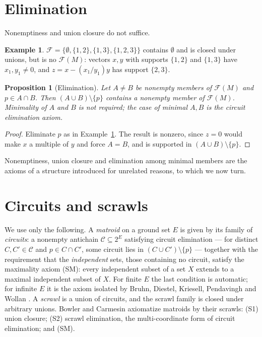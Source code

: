 \documentclass[11pt,reqno]{amsart}
\newtheorem{proposition}[theorem]{Proposition}
\theoremstyle{definition}
\newtheorem{example}[theorem]{Example}
\newcommand{\F}{\mathcal{F}}
\begin{document}
\section{Elimination}\label{sec:elimination}

Nonemptiness and union closure do not suffice.

\begin{example}\label{ex:elimination}
$\F=\{\emptyset,\{1,2\},\{1,3\},\{1,2,3\}\}$ contains $\emptyset$ and is closed
under unions, but is no $\F(M)$: vectors $x,y$ with supports $\{1,2\}$ and
$\{1,3\}$ have $x_1,y_1\neq0$, and $z=x-(x_1/y_1)y$ has support $\{2,3\}$.
\end{example}

\begin{proposition}[Elimination]\label{prop:elimination}
Let $A\neq B$ be nonempty members of $\F(M)$ and $p\in A\cap B$. Then
$(A\cup B)\setminus\{p\}$ contains a nonempty member of $\F(M)$. Minimality of
$A$ and $B$ is not required; the case of minimal $A,B$ is the circuit
elimination axiom.
\end{proposition}

\begin{proof}
Eliminate $p$ as in Example~\ref{ex:elimination}. The result is nonzero, since
$z=0$ would make $x$ a multiple of $y$ and force $A=B$, and is supported in
$(A\cup B)\setminus\{p\}$.
\end{proof}

Nonemptiness, union closure and elimination among minimal members are the
axioms of a structure introduced for unrelated reasons, to which we now turn.

\section{Circuits and scrawls}\label{sec:matroids}

We use only the following. A \emph{matroid} on a ground set $E$ is given by its
family of \emph{circuits}: a nonempty antichain $\mathcal C\subseteq2^E$
satisfying circuit elimination --- for distinct $C,C'\in\mathcal C$ and
$p\in C\cap C'$, some circuit lies in $(C\cup C')\setminus\{p\}$ --- together
with the requirement that the \emph{independent} sets, those containing no
circuit, satisfy the maximality axiom (SM): every independent subset of a set
$X$ extends to a maximal independent subset of $X$. For finite $E$ the last
condition is automatic; for infinite $E$ it is the axiom isolated by Bruhn,
Diestel, Kriesell, Pendavingh and Wollan \cite{BDKPW13}. A \emph{scrawl} is a
union of circuits, and the scrawl family is closed under arbitrary unions.
Bowler and Carmesin \cite{BC18} axiomatize matroids by their scrawls: (S1)
union closure; (S2) scrawl elimination, the multi-coordinate form of circuit
elimination; and (SM).
\end{document}
